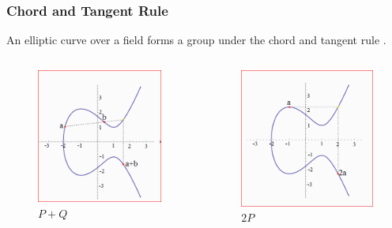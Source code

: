 \documentclass[xcolor=pdftex,dvipsnames,table]{beamer}
\theoremstyle{plain}
\theoremstyle{definition}
\begin{document}
\begin{frame}
	\frametitle{Chord and Tangent Rule}
	
	An elliptic curve over a field forms a group under the chord and tangent rule \cite{Galbraith}.
	\begin{columns}
	\begin{figure}
		\centering
		\includegraphics[scale=.3]{p_plus_q.png}
		\caption{$P+Q$}
	\end{figure}
	
	\begin{figure}
		\centering
		\includegraphics[scale=.3]{p_plus_p.png}
		\caption{$2P$}
	\end{figure}
	\end{columns}
\end{frame}
\end{document}
